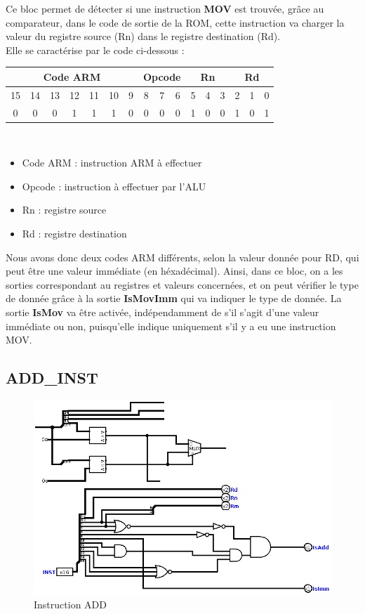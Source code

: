 \documentclass[a4paper]{article} %
\begin{document}
\medskip

Ce bloc permet de détecter si une instruction \textbf{MOV} est trouvée, grâce au comparateur, dans le code de sortie de la ROM, cette instruction va charger la valeur du registre source (Rn) dans le registre destination (Rd).\\
Elle se caractérise par le code ci-dessous : 
\\
\begin{tabular}{|ccccccc|ccc|ccc|ccc|}
    \hline
    \multicolumn{7}{|c|}{Code ARM}  & \multicolumn{3}{|c|}{Opcode} & \multicolumn{3}{|c|}{Rn} & \multicolumn{3}{|c|}{Rd}\\
    \hline
    15 & 14 & 13 & 12 & 11 & 10 & 9 & 8 & 7 & 6                    & 5 & 4 & 3                & 2 & 1 & 0 \\
    \hline
    0  & 0  & 0  & 1  & 1  & 1  & 0 & 0 & 0 & 0                    & 1 & 0 & 0                & 1 & 0 & 1 \\
    \hline     
    \end{tabular}
\\

\begin{itemize}
    \item     Code ARM : instruction ARM à effectuer
    \item     Opcode : instruction à effectuer par l'ALU
    \item     Rn : registre source
    \item     Rd : registre destination
\end{itemize}

\medskip
Nous avons donc deux codes ARM différents, selon la valeur donnée pour RD, qui peut être une valeur immédiate (en héxadécimal). Ainsi, dans ce bloc, on a les sorties correspondant au registres et valeurs concernées, et on peut vérifier le type de donnée grâce à la sortie \textbf{IsMovImm} qui va indiquer le type de donnée. La sortie \textbf{IsMov} va être activée, indépendamment de s'il s'agit d'une valeur immédiate ou non, puisqu'elle indique uniquement s'il y a eu une instruction MOV.



\subsection{ADD\_INST} \label{addinst}
\begin{figure}[H]
    \centering
    \includegraphics[width=.8\textwidth]{src/ADD_INST.png}
    \caption{Instruction ADD}
    \label{add_img}
\end{figure}
\end{document}
